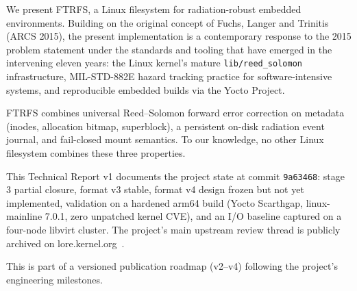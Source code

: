 We present FTRFS, a Linux filesystem for radiation-robust
embedded environments. Building on the original concept of Fuchs,
Langer and Trinitis (ARCS 2015), the present implementation is a
contemporary response to the 2015 problem statement under the
standards and tooling that have emerged in the intervening eleven
years: the Linux kernel's mature \texttt{lib/reed\_solomon}
infrastructure, MIL-STD-882E hazard tracking practice for
software-intensive systems, and reproducible embedded builds via
the Yocto Project.

FTRFS combines universal Reed--Solomon forward error correction on
metadata (inodes, allocation bitmap, superblock), a persistent
on-disk radiation event journal, and fail-closed mount semantics.
To our knowledge, no other Linux filesystem combines these three
properties.

This Technical Report v1 documents the project state at commit
\texttt{9a63468}: stage 3 partial closure, format v3 stable, format
v4 design frozen but not yet implemented, validation on a hardened
arm64 build (Yocto Scarthgap, linux-mainline 7.0.1, zero unpatched
kernel CVE), and an I/O baseline captured on a four-node libvirt
cluster. The project's main upstream review thread is publicly
archived on lore.kernel.org~\cite{ftrfs-rfc-thread}.

This is part of a versioned publication roadmap (v2--v4) following
the project's engineering milestones.
